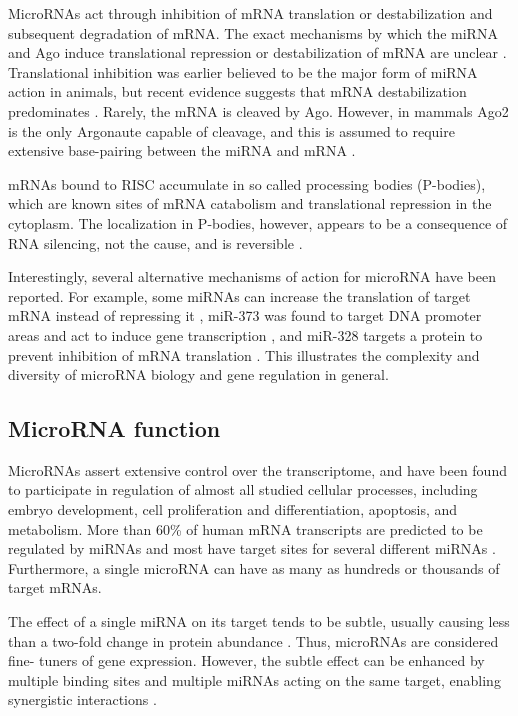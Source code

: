 MicroRNAs act through inhibition of mRNA translation or destabilization and
subsequent degradation of mRNA. The exact mechanisms by which the miRNA and
Ago induce translational repression or destabilization of mRNA are unclear
\citep{Filipowicz2008}. Translational inhibition was earlier believed to be
the major form of miRNA action in animals, but recent evidence suggests that
mRNA destabilization predominates \citep{Guo2010}. Rarely, the mRNA is
cleaved by Ago. However, in mammals Ago2 is the only Argonaute capable of
cleavage, and this is assumed to require extensive base-pairing between
the miRNA and mRNA \citep{Du2005}.

mRNAs bound to RISC accumulate in so called processing bodies (P-bodies),
which are known sites of mRNA catabolism and translational repression in the
cytoplasm. The localization in P-bodies, however, appears to be a consequence
of RNA silencing, not the cause, and is reversible \citep{Eulalio2007}.

Interestingly, several alternative mechanisms of action for microRNA have been
reported. For example, some miRNAs can increase the translation of target mRNA instead of
repressing it \citep{Vasudevan2007}, miR-373
was found to target DNA promoter areas and act to induce gene transcription
\citep{Place2008}, and miR-328 targets a protein to prevent inhibition of mRNA
translation \citep{Eiring2010}. This illustrates the complexity and diversity of
microRNA biology and gene regulation in general.




\subsection{MicroRNA function}\label{microrna-function}

MicroRNAs assert extensive control over the transcriptome, and have been found
to participate in regulation of almost all studied cellular processes,
including embryo development, cell proliferation and differentiation,
apoptosis, and metabolism. More than 60\% of human mRNA transcripts are
predicted to be regulated by miRNAs and most have target sites for several
different miRNAs \citep{Friedman2009}. Furthermore, a single microRNA can have
as many as hundreds or thousands of target mRNAs.

The effect of a single miRNA
on its target tends to be subtle, usually causing less than a two-fold change
in protein abundance \citep{Baek2008}. Thus, microRNAs are considered fine-
tuners of gene expression. However, the subtle effect can be enhanced by
multiple binding sites and multiple miRNAs acting on the same target, enabling
synergistic interactions \citep{Bartel2009}.

